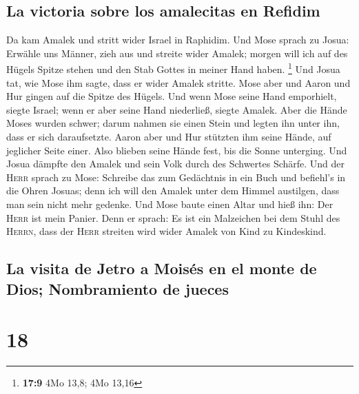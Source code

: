 \hypertarget{la-victoria-sobre-los-amalecitas-en-refidim}{%
\subsection{La victoria sobre los amalecitas en
Refidim}\label{la-victoria-sobre-los-amalecitas-en-refidim}}

 Da kam Amalek und stritt wider Israel in Raphidim.
 Und Mose sprach zu Josua: Erwähle uns Männer, zieh aus
und streite wider Amalek; morgen will ich auf des Hügels Spitze stehen
und den Stab Gottes in meiner Hand haben. \footnote{\textbf{17:9} 4Mo
  13,8; 4Mo 13,16}  Und Josua tat, wie Mose ihm sagte,
dass er wider Amalek stritte. Mose aber und Aaron und Hur gingen auf die
Spitze des Hügels.  Und wenn Mose seine Hand emporhielt,
siegte Israel; wenn er aber seine Hand niederließ, siegte Amalek.
 Aber die Hände Moses wurden schwer; darum nahmen sie
einen Stein und legten ihn unter ihn, dass er sich daraufsetzte. Aaron
aber und Hur stützten ihm seine Hände, auf jeglicher Seite einer. Also
blieben seine Hände fest, bis die Sonne unterging.  Und
Josua dämpfte den Amalek und sein Volk durch des Schwertes Schärfe.
 Und der \textsc{Herr} sprach zu Mose: Schreibe das zum
Gedächtnis in ein Buch und befiehl's in die Ohren Josuas; denn ich will
den Amalek unter dem Himmel austilgen, dass man sein nicht mehr gedenke.
 Und Mose baute einen Altar und hieß ihn: Der
\textsc{Herr} ist mein Panier.  Denn er sprach: Es ist
ein Malzeichen bei dem Stuhl des \textsc{Herrn}, dass der \textsc{Herr}
streiten wird wider Amalek von Kind zu Kindeskind.

\hypertarget{la-visita-de-jetro-a-moisuxe9s-en-el-monte-de-dios-nombramiento-de-jueces}{%
\subsection{La visita de Jetro a Moisés en el monte de Dios;
Nombramiento de
jueces}\label{la-visita-de-jetro-a-moisuxe9s-en-el-monte-de-dios-nombramiento-de-jueces}}

\hypertarget{section-17}{%
\section{18}\label{section-17}}


